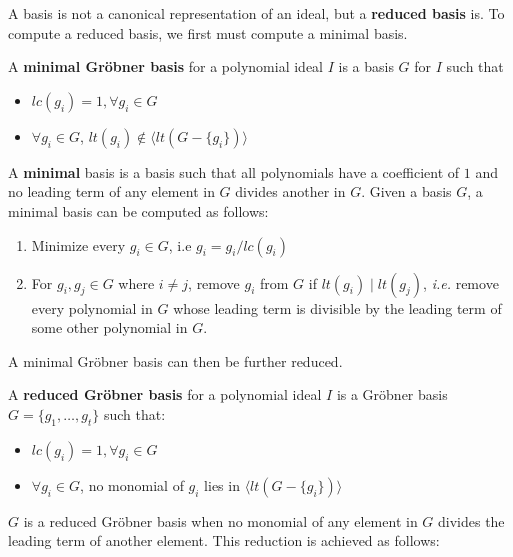 A \Grobner basis is not a canonical representation of an ideal, but a
{\bf reduced \Grobner basis} is. To compute a reduced \Grobner basis, we
first must compute a minimal \Grobner basis.

\begin{Definition}\label{def:minigb}
A {\bf minimal Gr\"obner basis} for a polynomial ideal $I$ is a \Grobner basis $G$ for $I$ such that
	\begin{itemize}
		\item $lc(g_{i})=1,\forall g_{i}\in G$
		\item $\forall g_{i} \in G$,  $lt(g_{i}) \notin \langle lt(G-\{g_{i}\})\rangle$
	\end{itemize}
\end{Definition}
A {\bf minimal} \Grobner basis is a \Grobner basis such that all polynomials
have a coefficient of $1$ and no leading term of any element in $G$ divides 
another in $G$.
Given a \Grobner basis $G$, a minimal \Grobner basis can be
computed as follows:
\begin{enumerate}
\item Minimize every $g_i \in G$, i.e $g_i=g_i/lc(g_i)$
\item For $g_i, g_j \in G$ where $i\neq j$, remove $g_i$ from $G$ if $lt(g_i)\mid lt(g_j)$, 
{\it i.e.} remove every polynomial in $G$ whose leading term is divisible by the leading term 
of some other polynomial in $G$.
\end{enumerate}

A minimal Gr\"obner basis can then be further reduced.
\begin{Definition}
	A {\bf reduced Gr\"obner basis} for a polynomial ideal $I$ is a Gr\"obner basis $G=\{g_{1},\dots,g_{t}\}$ such that:
	\begin{itemize}
		\item $lc(g_{i})=1,\forall g_{i}\in G$
		\item $\forall g_{i} \in G$, no monomial of $g_{i}$ lies in $\langle lt(G-\{g_{i}\})\rangle$
	\end{itemize}
\end{Definition}
$G$ is a reduced Gr\"obner basis when no monomial of any element in $G$ 
divides the leading term of another element. 
This reduction is achieved as follows:

